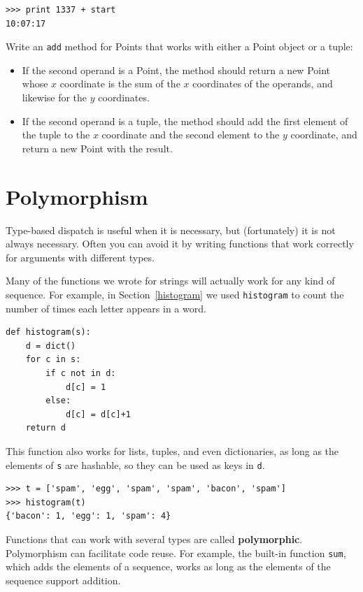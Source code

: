 \documentclass[10pt]{book}
\begin{document}
\begin{verbatim}
>>> print 1337 + start
10:07:17
\end{verbatim}
%

\begin{exercise}

Write an {\tt add} method for Points that works with either a
Point object or a tuple:  

\begin{itemize}

\item If the second operand is a Point, the method should return a new
Point whose $x$ coordinate is the sum of the $x$ coordinates of the
operands, and likewise for the $y$ coordinates.

\item If the second operand is a tuple, the method should add the
first element of the tuple to the $x$ coordinate and the second
element to the $y$ coordinate, and return a new Point with the result. 

\end{itemize}

\end{exercise}

\section{Polymorphism}

Type-based dispatch is useful when it is necessary, but (fortunately)
it is not always necessary.  Often you can avoid it by writing functions
that work correctly for arguments with different types.

Many of the functions we wrote for strings will actually
work for any kind of sequence.
For example, in Section~\ref{histogram}
we used {\tt histogram} to count the number of times each letter
appears in a word.

\begin{verbatim}
def histogram(s):
    d = dict()
    for c in s:
        if c not in d:
            d[c] = 1
        else:
            d[c] = d[c]+1
    return d
\end{verbatim}
%
This function also works for lists, tuples, and even dictionaries,
as long as the elements of {\tt s} are hashable, so they can be used
as keys in {\tt d}.

\begin{verbatim}
>>> t = ['spam', 'egg', 'spam', 'spam', 'bacon', 'spam']
>>> histogram(t)
{'bacon': 1, 'egg': 1, 'spam': 4}
\end{verbatim}
%
Functions that can work with several types are called {\bf polymorphic}.
Polymorphism can facilitate code reuse.  For example, the built-in
function {\tt sum}, which adds the elements of a sequence, works
as long as the elements of the sequence support addition.
\end{document}
